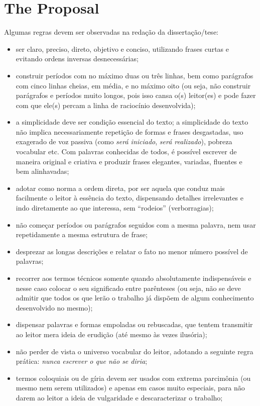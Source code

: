 \chapter{The Proposal}

Algumas regras devem ser observadas na redação da dissertação/tese: 

\begin{itemize}
   \item ser claro, preciso, direto, objetivo e conciso, utilizando frases curtas e evitando ordens inversas desnecessárias;
   \item construir períodos com no máximo duas ou três linhas, bem como parágrafos com cinco linhas cheias, em média, e no máximo oito (ou seja, não construir parágrafos e períodos muito longos, pois isso cansa o(s) leitor(es) e pode fazer com que ele(s) percam a linha de raciocínio desenvolvida);
   \item a simplicidade deve ser condição essencial do texto; a simplicidade do texto não implica necessariamente repetição de formas e frases desgastadas, uso exagerado de voz passiva (como \textit{será iniciado}, \textit{será realizado}), pobreza vocabular etc. Com palavras conhecidas de todos, é possível escrever de maneira original e criativa e produzir frases elegantes, variadas, fluentes e bem alinhavadas;
   \item adotar como norma a ordem direta, por ser aquela que conduz mais facilmente o leitor à essência do texto, dispensando detalhes irrelevantes e indo diretamente ao que interessa, sem ``rodeios'' (verborragias);
   \item não começar períodos ou parágrafos seguidos com a mesma palavra, nem usar repetidamente a mesma estrutura de frase;
   \item desprezar as longas descrições e relatar o fato no menor número possível de palavras;
   \item recorrer aos termos técnicos somente quando absolutamente indispensáveis e nesse caso colocar o seu significado entre parênteses (ou seja, não se deve admitir que todos os que lerão o trabalho já dispõem de algum conhecimento desenvolvido no mesmo);
   \item dispensar palavras e formas empoladas ou rebuscadas, que tentem transmitir ao leitor mera ideia de erudição (até mesmo às vezes ilusória);
   \item não perder de vista o universo vocabular do leitor, adotando a seguinte regra prática: \textit{nunca escrever o que não se diria};
   \item termos coloquiais ou de gíria devem ser usados com extrema parcimônia (ou mesmo nem serem utilizados) e apenas em casos muito especiais, para não darem ao leitor a ideia de vulgaridade e descaracterizar o trabalho;

\end{itemize}
